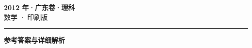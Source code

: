 \documentclass[zihao=5, a4paper]{ctexart}
\begin{document}
\begin{center}
  {\Large\bfseries 2012 年·广东卷·理科}\\[4pt]
  {\large 数学 · 印刷版}
\end{center}
\medskip
{}

\par\bigskip\hrule\bigskip
{}
\Needspace{0.55\textheight}
\begin{center}{\large\bfseries 参考答案与详细解析}\end{center}
\smallskip

\end{document}
